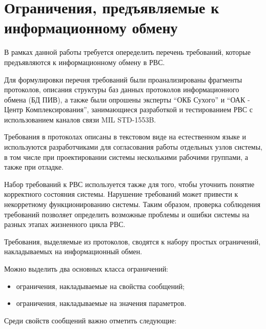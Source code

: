 \section{Ограничения, предъявляемые к информационному обмену}

\iffalse

Тезисы:

0. В разных протоколах написаны примерно одинаковые вещи =>
1. Требования нужно разбивать на простые, и это будет универсально и удобно.
2. Список требований как результат изучения протоколов и обсуждения с 
разработчиками и тестерами РВС.
3. Замечание о том, что в данной работе мы работаем с МКИО, но подразумевается 
расширение и на другие каналы связи.

\fi

В рамках данной работы требуется опеределить перечень требований, которые 
предъявляются к информационному обмену в РВС.

Для формулировки перечня требований были проанализированы фрагменты протоколов, 
описания структуры баз данных протоколов информационного обмена (БД ПИВ), а 
также были опрошены эксперты ``ОКБ Сухого'' и ``ОАК - Центр Комплексирования'', 
занимающиеся разработкой и тестированием РВС с использованием каналов связи MIL 
STD-1553B.

Требования в протоколах описаны в текстовом виде на естественном 
языке и используются разработчиками для согласования работы отдельных узлов 
системы, в том числе при проектировании системы несколькими рабочими группами, 
а также при отладке.

Набор требований к РВС используется также для того, чтобы уточнить понятие 
корректного состояния системы. Нарушение требований может привести к 
некорретному функционированию системы. Таким образом, проверка соблюдения 
требований позволяет определить возможные проблемы и ошибки системы на разных 
этапах жизненного цикла РВС.

Требования, выделяемые из протоколов, сводятся к набору простых ограничений, 
накладываемых на информационный обмен. 

Можно выделить два основных класса ограничений:

\begin{itemize}
 \item ограничения, накладываемые на свойства сообщений;
 \item ограничения, накладываемые на значения параметров.
\end{itemize}

Среди свойств сообщений важно отметить следующие:

